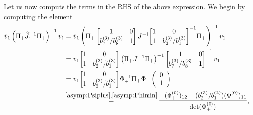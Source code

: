 \documentclass[a4paper,reqno,11pt]{amsart}
\numberwithin{equation}{section}
\numberwithin{figure}{section}
\theoremstyle{plain}
\theoremstyle{remark}
\numberwithin{rhp}{section}
\begin{document}
Let us now compute the terms in the RHS of the above expression. We begin by computing the element
\begin{align}
    \bar{v}_1 \left(\Pi_{+} \widetilde{J}_1^{-1} \Pi_{+} \right)^{-1} v_1 &= \bar{v}_1 \left(\Pi_{+}\begin{bmatrix}
       1  & 0 \\
        b_7^{(3)}/b_8^{(3)} & 1
    \end{bmatrix} J^{-1} { \begin{bmatrix}
       1 & 0 \\
        1 & b_2^{(3)}/b_1^{(3)}
    \end{bmatrix}}^{-1}\Pi_{+} \right)^{-1} v_1 \\
    & = \bar{v}_1 { \begin{bmatrix}
       1 & 0 \\
        1 & b_2^{(3)}/b_1^{(3)}
    \end{bmatrix}} \left(\Pi_{+}J^{-1}\Pi_{+} \right)^{-1} \begin{bmatrix}
       1  & 0 \\
        b_7^{(3)}/b_8^{(3)} & 1
    \end{bmatrix}^{-1}  v_1 \\
    & = \bar{v}_1 { \begin{bmatrix}
       1 & 0 \\
        1 & b_2^{(3)}/b_1^{(3)}
    \end{bmatrix}} \Phi_{+}^{-1} \Pi_{+} \Phi_{-}  \left( \begin{array}{c}
             0  \\
             1 
        \end{array}\right) \\
    &\mathop{=}^{\eqref{asymp:Psiplus},\eqref{asymp:Phimin}} \frac{{ - (\Phi_{+}^{(0)})_{12} + (b_2^{(3)}/b_1^{(2)}) (\Phi_{+}^{(0)})_{11}}}{\det (\Phi_{+}^{(0)})},\label{tau1comp:term1}
\end{align}
\end{document}
